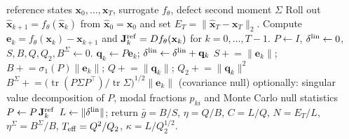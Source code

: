 \begin{algorithm}[t]
\caption{Realized-error budget of one forecast window}
\label{alg:diagnostic}
\begin{algorithmic}[1]
\REQUIRE reference states $\mathbf x_0,\ldots,\mathbf x_T$, surrogate $f_\theta$, defect second moment $\Sigma$
\STATE Roll out $\hat{\mathbf x}_{k+1}=f_\theta(\hat{\mathbf x}_k)$ from $\hat{\mathbf x}_0=\mathbf x_0$ and set $E_T=\|\hat{\mathbf x}_T-\mathbf x_T\|_2$.
\STATE Compute $\mathbf e_k=f_\theta(\mathbf x_k)-\mathbf x_{k+1}$ and $\mathbf J^{\rm ref}_k=Df_\theta(\mathbf x_k)$ for $k=0,\ldots,T-1$.
\STATE $P\leftarrow I$, $\delta^{\rm lin}\leftarrow0$, $S,B,Q,Q_2,B^\Sigma\leftarrow0$.
  \STATE $\mathbf q_k\leftarrow P\mathbf e_k$; $\delta^{\rm lin}\leftarrow\delta^{\rm lin}+\mathbf q_k$
  \STATE $S\mathrel{+}=\|\mathbf e_k\|$; $B\mathrel{+}=\sigma_1(P)\|\mathbf e_k\|$; $Q\mathrel{+}=\|\mathbf q_k\|$; $Q_2\mathrel{+}=\|\mathbf q_k\|^2$
  \STATE $B^\Sigma\mathrel{+}=\big(\operatorname{tr}(P\Sigma P^\top)/\operatorname{tr}\Sigma\big)^{1/2}\|\mathbf e_k\|$ \hfill (covariance null)
  \STATE optionally: singular value decomposition of $P$, modal fractions $p_{ki}$ and Monte Carlo null statistics
  \STATE $P\leftarrow P\,\mathbf J^{\rm ref}_k$
\ENDFOR
\STATE $L\leftarrow\|\delta^{\rm lin}\|$; return $\bar g=B/S$, $\eta=Q/B$, $C=L/Q$, $N=E_T/L$, $\eta^\Sigma=B^\Sigma/B$, $T_{\rm eff}=Q^2/Q_2$, $\kappa=L/Q_2^{1/2}$.
\end{algorithmic}
\end{algorithm}
